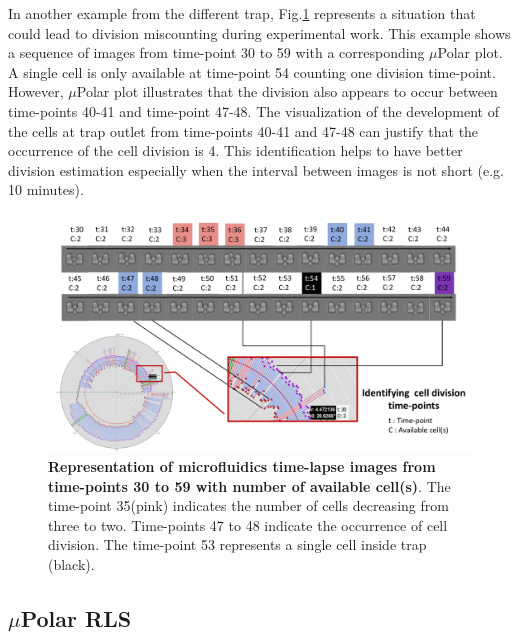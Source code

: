 \documentclass[conference]{IEEEtran}
\begin{document}
In another example from the different trap, Fig.\ref{fig:division} represents a situation that could lead to division miscounting during experimental work. This example shows a sequence of images from time-point 30 to 59 with a corresponding $\mu$Polar plot. A single cell is only available at time-point 54 counting one division time-point. However, $\mu$Polar plot illustrates that the division also appears to occur between time-points 40-41 and time-point 47-48. The visualization of the development of the cells at trap outlet from time-points 40-41 and 47-48 can justify that the occurrence of the cell division is 4. This identification helps to have better division estimation especially when the interval between images is not short (e.g. 10 minutes). 

\begin{figure}
\centering
\includegraphics[width=\textwidth,height=10 cm]{Patterns/division.pdf}
\caption{ \textbf{ Representation of microfluidics time-lapse images from time-points 30 to 59 with number of available cell(s)}. The time-point 35(pink) indicates the number of cells decreasing from three to two. Time-points 47 to 48 indicate the occurrence of cell division. The time-point 53 represents a single cell inside trap (black).}
\label{fig:division}
\end{figure}



\subsection{$\mu$Polar RLS}
\end{document}
